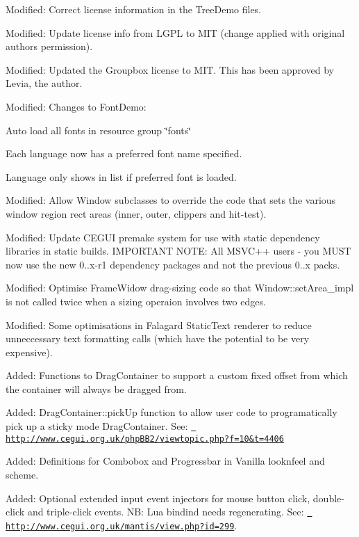 \begin{DoxyItemize}
\item Modified\+: Correct license information in the Tree\+Demo files.
\item Modified\+: Update license info from L\+G\+PL to M\+IT (change applied with original author\textquotesingle{}s permission).
\item Modified\+: Updated the Groupbox license to M\+IT. This has been approved by Levia, the author.
\item Modified\+: Changes to Font\+Demo\+:
\begin{DoxyItemize}
\item Auto load all fonts in resource group \char`\"{}fonts\char`\"{}
\item Each language now has a \textquotesingle{}preferred font\textquotesingle{} name specified.
\item Language only shows in list if preferred font is loaded.
\end{DoxyItemize}
\item Modified\+: Allow Window subclasses to override the code that sets the various window region rect areas (inner, outer, clippers and hit-\/test).
\item Modified\+: Update C\+E\+G\+UI premake system for use with static dependency libraries in static builds. I\+M\+P\+O\+R\+T\+A\+NT N\+O\+TE\+: All M\+S\+V\+C++ users -\/ you M\+U\+ST now use the new 0..\+x-\/r1 dependency packages and not the previous 0..\+x packs.
\item Modified\+: Optimise Frame\+Widow drag-\/sizing code so that Window\+::set\+Area\+\_\+impl is not called twice when a sizing operaion involves two edges.
\item Modified\+: Some optimisations in Falagard Static\+Text renderer to reduce unneccessary text formatting calls (which have the potential to be very expensive).
\item Added\+: Functions to Drag\+Container to support a custom fixed offset from which the container will always be dragged from.
\item Added\+: Drag\+Container\+::pick\+Up function to allow user code to programatically pick up a sticky mode Drag\+Container. See\+: \href{http://www.cegui.org.uk/phpBB2/viewtopic.php?f=10&t=4406}{\texttt{ http\+://www.\+cegui.\+org.\+uk/php\+B\+B2/viewtopic.\+php?f=10\&t=4406}}
\item Added\+: Definitions for Combobox and Progressbar in Vanilla looknfeel and scheme.
\item Added\+: Optional extended input event injectors for mouse button click, double-\/click and triple-\/click events. NB\+: Lua bindind needs regenerating. See\+: \href{http://www.cegui.org.uk/mantis/view.php?id=299}{\texttt{ http\+://www.\+cegui.\+org.\+uk/mantis/view.\+php?id=299}}.

\end{DoxyItemize}
